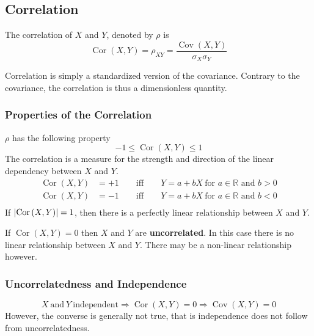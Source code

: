 \documentclass[11pt]{article}
\newcommand*\R{\mathbb{R}}
\newcommand*\Cov[1]{\mathop{\text{Cov}}\left(#1\right)}
\newcommand*\Cor[1]{\mathop{\text{Cor}}\left(#1\right)}
\DeclarePairedDelimiter\abs{\lvert}{\rvert}
\begin{document}
\subsection{Correlation}
\begin{definition}
	The correlation of $X$ and $Y$, denoted by $\rho$ is
	\begin{equation*}
		\Cor{X,Y} = \rho_{XY} = \frac{\Cov{X,Y}}{\sigma_X\sigma_Y}
	\end{equation*}
\end{definition}
Correlation is simply a standardized version of the covariance. Contrary to the covariance, the correlation is thus a dimensionless quantity. 

\subsubsection{Properties of the Correlation}
$\rho$ has the following property
\begin{equation*}
	-1 \leq \Cor{X,Y} \leq 1
\end{equation*}
The correlation is a measure for the strength and direction of the linear dependency between $X$ and $Y$.
\begin{align*}
	\Cor{X,Y} &= +1 \qquad\text{iff}\qquad Y=a+bX\ \text{for $a\in\R$ and $b>0$}\\
	\Cor{X,Y} &= -1 \qquad\text{iff}\qquad Y=a+bX\ \text{for $a\in\R$ and $b<0$}\\
\end{align*}
If $\abs{\Cor{X,Y}} = 1$, then there is a perfectly linear relationship between $X$ and $Y$.

\begin{definition}
	If $\Cor{X,Y}=0$ then $X$ and $Y$ are \textbf{uncorrelated}. In this case there is no linear relationship between $X$ and $Y$. There may be a non-linear relationship however.
\end{definition}

\subsubsection{Uncorrelatedness and Independence}
\begin{equation*}
	X\ \text{and}\ Y\ \text{independent} \Rightarrow \Cor{X,Y}=0\Rightarrow \Cov{X,Y}=0
\end{equation*}
However, the converse is generally not true, that is independence does not follow from uncorrelatedness.
\end{document}
